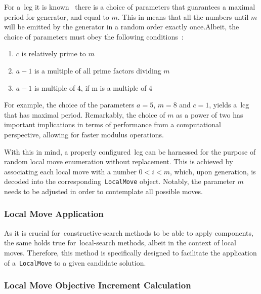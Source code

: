 For a~\acrshort{lcg} it is known~\cite{knuth2014art} there is a choice of
parameters that guarantees a maximal period for generator, and equal to $m$.
This in means that all the numbers until $m$ will be emitted by the generator in
a random order exactly once.Albeit, the choice of parameters must obey the
following conditions~\cite{knuth2014art}:

\begin{enumerate}
  \item $c$ is relatively prime to $m$
  \item $a - 1$ is a multiple of all prime factors dividing $m$
  \item $a - 1$ is multiple of 4, if m is a multiple of 4
\end{enumerate}

For example, the choice of the parameters $a = 5$, $m = 8$ and $c = 1$, yields
a~\acrshort{lcg} that has maximal period. Remarkably, the choice of $m$ as a
power of two has important implications in terms of performance from a
computational perspective, allowing for faster modulus operations.

With this in mind, a properly configured~\acrshort{lcg} can be harnessed for the
purpose of random local move enumeration without replacement. This is achieved
by associating each local move with a number $0 < i < m$, which, upon
generation, is decoded into the corresponding~\texttt{LocalMove} object.
Notably, the parameter $m$ needs to be adjusted in order to contemplate all
possible moves.

\subsubsection*{Local Move Application}

As it is crucial for~\acrshort{constructive-search} methods to be able to apply
components, the same holds true for~\acrshort{local-search} methods, albeit in
the context of local moves. Therefore, this method is specifically designed to
facilitate the application of a~\texttt{LocalMove} to a given candidate solution.

\begin{center}
\end{center}

\subsubsection*{Local Move Objective Increment Calculation}

